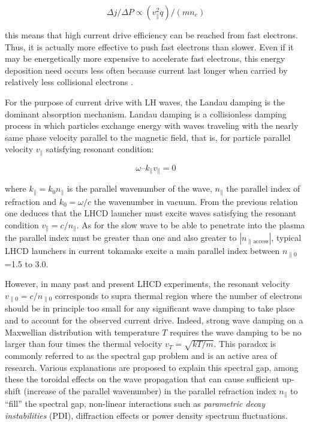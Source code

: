 $$\Delta j/ \Delta P \propto (v_{\parallel}^2 q) / (m n_e)$$

this means that high current drive efficiency can be reached from fast electrons. Thus, it is actually more effective to push fast electrons than slower. Even if it may be energetically more expensive to accelerate fast electrons, this energy deposition need occurs less often because current last longer when carried by relatively less collisional electrons \parencite{Fisch1987}. 

For the purpose of current drive with LH waves, the Landau damping is the dominant absorption mechanism. Landau damping is a collisionless damping process in which particles exchange energy with waves traveling with the nearly same phase velocity parallel to the magnetic field, that is, for particle parallel velocity $v_{\parallel}$ satisfying resonant condition:

$$\omega – k_{\parallel} v_{\parallel} = 0 $$ 

where $k_{\parallel}=k_0 n_{\parallel}$ is the parallel wavenumber of the wave, $n_{\parallel}$ the parallel index of refraction and $k_0= \omega/c$ the wavenumber in vacuum. From the previous relation one deduces that the LHCD launcher must excite waves satisfying the resonant condition $v_{\parallel}=c/n_{\parallel}$. As for the slow wave to be able to penetrate into the plasma the parallel index must be greater than one and also greater to $|n_{\parallel \mathrm{access}}|$, typical LHCD launchers in current tokamaks excite a main parallel index between $n_{\parallel 0}$=1.5 to 3.0. 

However, in many past and present LHCD experiments, the resonant velocity $v_{\parallel 0}=c/n_{\parallel 0}$ corresponds to supra thermal region where the number of electrons should be in principle too small for any significant wave damping to take place and to account for the observed current drive. Indeed, strong wave damping on a Maxwellian distribution with temperature $T$ requires the wave damping to be no larger than four times the thermal velocity $v_T=\sqrt{k T/m}$. This paradox is commonly referred to as the spectral gap problem and is an active area of research. Various explanations are proposed to explain this spectral gap, among these the toroidal effects on the wave propagation that can cause sufficient up-shift (increase of the parallel wavenumber) in the parallel refraction index $n_{\parallel}$ to “fill” the spectral gap, non-linear interactions such as \textit{parametric decay instabilities} (PDI), diffraction effects or power density spectrum fluctuations. 


